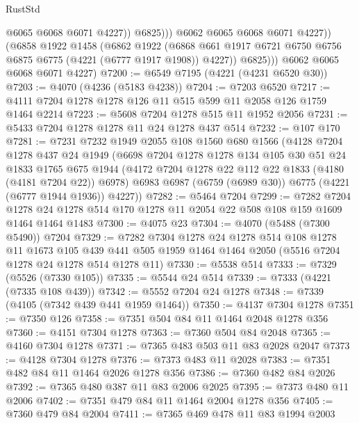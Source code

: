 \begin{lexlean}{RustStd}
\begin{coremodule}
                        @6065
                        @6068
                        @6071
                        @4227))
                    @6825)))
              @6062
              @6065
              @6068
              @6071
              @4227))
          (@6858
            @1922
            @1458
            (@6862
              @1922
              (@6868 @661 @1917 @6721 @6750 @6756 @6875 @6775 (@4221 (@6777 @1917 @1908)) @4227))
            @6825)))
      @6062
      @6065
      @6068
      @6071
      @4227)
@7200 := @6549 @7195 (@4221 (@4231 @6520 @30))
@7203 := @4070 (@4236 (@5183 @4238))
@7204 := @7203 @6520
@7217 := @4111 @7204 @1278 @1278 @126 @11 @515 @599 @11 @2058 @126 @1759 @1464 @2214
@7223 := @5608 @7204 @1278 @515 @11 @1952 @2056
@7231 := @5433 @7204 @1278 @1278 @11 @24 @1278 @437 @514
@7232 := @107 @170
@7281 := @7231
    @7232
    @1949
    @2055
    @108
    @1560
    @680
    @1566
    (@4128
      @7204
      @1278
      @437
      @24
      @1949
      (@6698
        @7204
        @1278
        @1278
        @134
        @105
        @30
        @51
        @24
        @1833
        @1765
        @675
        @1944
        (@4172 @7204 @1278 @22 @112 @22 @1833 (@4180 (@4181 @7204 @22)) @6978)
        @6983
        @6987
        (@6759 (@6989 @30))
        @6775
        (@4221 (@6777 @1944 @1936))
        @4227))
@7282 := @5464 @7204
@7299 := @7282
    @7204
    @1278
    @24
    @1278
    @514
    @170
    @1278
    @11
    @2054
    @22
    @508
    @108
    @159
    @1609
    @1464
    @1464
    @1483
@7300 := @4075 @23
@7304 := @4070 (@5488 (@7300 @5490)) @7204
@7329 := @7282
    @7304
    @1278
    @24
    @1278
    @514
    @108
    @1278
    @11
    @1673
    @105
    @439
    @441
    @505
    @1959
    @1464
    @1464
    @2050
    (@5516 @7204 @1278 @24 @1278 @514 @1278 @11)
@7330 := @5538 @514
@7333 := @7329 (@5526 (@7330 @105))
@7335 := @5544 @24 @514
@7339 := @7333 (@4221 (@7335 @108 @439))
@7342 := @5552 @7204 @24 @1278
@7348 := @7339 (@4105 (@7342 @439 @441 @1959 @1464))
@7350 := @4137 @7304 @1278
@7351 := @7350 @126
@7358 := @7351 @504 @84 @11 @1464 @2048 @1278 @356
@7360 := @4151 @7304 @1278
@7363 := @7360 @504 @84 @2048
@7365 := @4160 @7304 @1278
@7371 := @7365 @483 @503 @11 @83 @2028 @2047
@7373 := @4128 @7304 @1278
@7376 := @7373 @483 @11 @2028
@7383 := @7351 @482 @84 @11 @1464 @2026 @1278 @356
@7386 := @7360 @482 @84 @2026
@7392 := @7365 @480 @387 @11 @83 @2006 @2025
@7395 := @7373 @480 @11 @2006
@7402 := @7351 @479 @84 @11 @1464 @2004 @1278 @356
@7405 := @7360 @479 @84 @2004
@7411 := @7365 @469 @478 @11 @83 @1994 @2003

\end{coremodule}
\end{lexlean}
